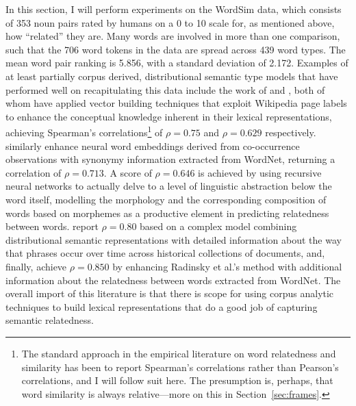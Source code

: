In this section, I will perform experiments on the WordSim data, which consists of 353 noun pairs rated by humans on a 0 to 10 scale for, as mentioned above, how ``related'' they are.  Many words are involved in more than one comparison, such that the 706 word tokens in the data are spread across 439 word types.  The mean word pair ranking is 5.856, with a standard deviation of 2.172.  Examples of at least partially corpus derived, distributional semantic type models that have performed well on recapitulating this data include the work of \cite{GabrilovichEA2007} and \cite{HassanEA2011}, both of whom have applied vector building techniques that exploit Wikipedia page labels to enhance the conceptual knowledge inherent in their lexical representations, achieving Spearman's correlations\footnote{The standard approach in the empirical literature on word relatedness and similarity has been to report Spearman's correlations rather than Pearson's correlations, and I will follow suit here.  The presumption is, perhaps, that word similarity is always relative---more on this in Section~\ref{sec:frames}.} of $\rho = 0.75$ and $\rho = 0.629$ respectively.  \cite{HuangEA2012} similarly enhance neural word embeddings derived from co-occurrence observations with synonymy information extracted from WordNet, returning a correlation of $\rho = 0.713$.  A score of $\rho = 0.646$ is achieved by \cite{LuongEA2013} using recursive neural networks to actually delve to a level of linguistic abstraction below the word itself, modelling the morphology and the corresponding composition of words based on morphemes as a productive element in predicting relatedness between words.  \cite{RadinskyEA2011} report $\rho = 0.80$ based on a complex model combining distributional semantic representations with detailed information about the way that phrases occur over time across historical collections of documents, and, finally, \cite{HalawiEA2012} achieve $\rho = 0.850$ by enhancing Radinsky et al.'s method with additional information about the relatedness between words extracted from WordNet.  The overall import of this literature is that there is scope for using corpus analytic techniques to build lexical representations that do a good job of capturing semantic relatedness.


